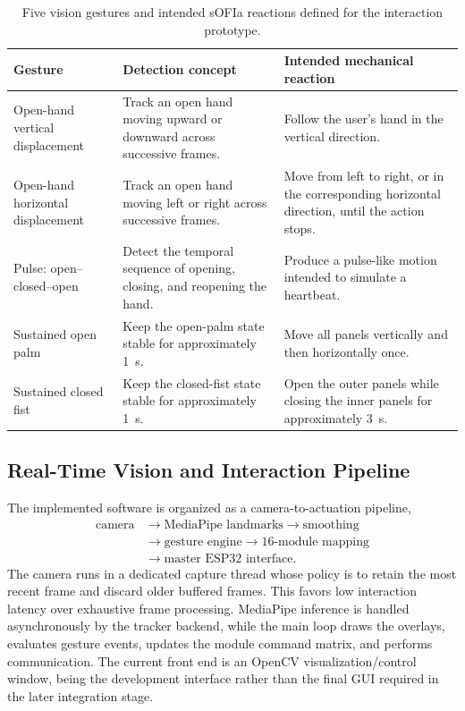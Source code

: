 \documentclass[lettersize,journal]{IEEEtran}
\begin{document}
\begin{table}[H]
\centering
\caption{Five vision gestures and intended sOFIa reactions defined for the interaction prototype.}
\label{tab:gestures}
\scriptsize
\setlength{\tabcolsep}{2.5pt}
\begin{tabularx}{\columnwidth}{p{2.0cm}p{3.0cm}X}
\hline
\textbf{Gesture} & \textbf{Detection concept} & \textbf{Intended mechanical reaction} \\
\hline
Open-hand vertical displacement & Track an open hand moving upward or downward across successive frames. & Follow the user's hand in the vertical direction. \\
Open-hand horizontal displacement & Track an open hand moving left or right across successive frames. & Move from left to right, or in the corresponding horizontal direction, until the action stops. \\
Pulse: open--closed--open & Detect the temporal sequence of opening, closing, and reopening the hand. & Produce a pulse-like motion intended to simulate a heartbeat. \\
Sustained open palm & Keep the open-palm state stable for approximately 1~s. & Move all panels vertically and then horizontally once. \\
Sustained closed fist & Keep the closed-fist state stable for approximately 1~s. & Open the outer panels while closing the inner panels for approximately 3~s. \\
\hline
\end{tabularx}
\end{table}

\subsection{Real-Time Vision and Interaction Pipeline}
\label{sec:vision-pipeline}

The implemented software is organized as a camera-to-actuation pipeline,
\begin{equation}
\begin{aligned}
\text{camera} &\rightarrow \text{MediaPipe landmarks} \rightarrow \text{smoothing}\\
&\rightarrow \text{gesture engine} \rightarrow \text{16-module mapping}\\
&\rightarrow \text{master ESP32 interface}.
\end{aligned}
\label{eq:vision-chain}
\end{equation}
The camera runs in a dedicated capture thread whose policy is to retain the most recent frame and discard older buffered frames. This favors low interaction latency over exhaustive frame processing. MediaPipe inference is handled asynchronously by the tracker backend, while the main loop draws the overlays, evaluates gesture events, updates the module command matrix, and performs communication. The current front end is an OpenCV visualization/control window, being the development interface rather than the final GUI required in the later integration stage.
\end{document}
